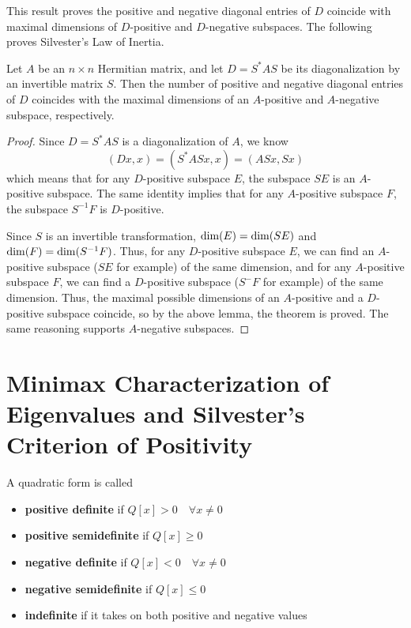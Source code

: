 This result proves the positive and negative diagonal entries of $D$ coincide with maximal dimensions of $D$-positive and $D$-negative subspaces. The following proves Silvester's Law of Inertia. 

\begin{theorem}
Let $A$ be an $n \times n$ Hermitian matrix, and let $D = S^{*} AS$ be its diagonalization by an invertible matrix $S$. Then the number of positive and negative diagonal entries of $D$ coincides with the maximal dimensions of an $A$-positive and $A$-negative subspace, respectively. 
\end{theorem}

\begin{proof}
Since $D = S^{*}AS$ is a diagonalization of $A$, we know 
$$(Dx, x) = (S^{*}ASx, x) = (ASx, Sx)$$
which means that for any $D$-positive subspace $E$, the subspace $SE$ is an $A$-positive subspace. The same identity implies that for any $A$-positive subspace $F$, the subspace $S^{-1}F$ is $D$-positive. 

Since $S$ is an invertible transformation, $\operatorname{dim}(E) = \operatorname{dim}(SE)$ and $\operatorname{dim}(F) = \operatorname{dim}(S^{-1}F)$. Thus, for any $D$-positive subspace $E$, we can find an $A$-positive subspace ($SE$ for example) of the same dimension, and for any $A$-positive subspace $F$, we can find a $D$-positive subspace ($S^{-}F$ for example) of the same dimension. Thus, the maximal possible dimensions of an $A$-positive and a $D$-positive subspace coincide, so by the above lemma, the theorem is proved. The same reasoning supports $A$-negative subspaces. 
\end{proof}

\section{Minimax Characterization of Eigenvalues and Silvester's Criterion of Positivity}

\begin{definition}
A quadratic form is called 
\begin{itemize}
	\item \textbf{positive definite} if $Q[x] > 0 \quad \forall x \neq 0$
	\item \textbf{positive semidefinite} if $Q[x] \geq 0$
	\item \textbf{negative definite} if $Q[x] < 0 \quad \forall x \neq 0$ 
	\item \textbf{negative semidefinite} if $Q[x] \leq 0$ 
	\item \textbf{indefinite} if it takes on both positive and negative values 
\end{itemize}
\end{definition}

